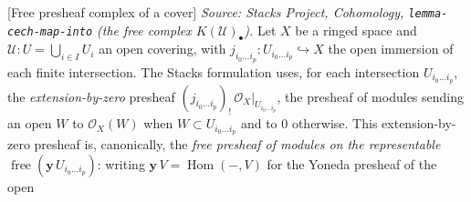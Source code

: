 \begin{definition}

[Free presheaf complex of a cover]
  \label{def:cech_free_presheaf_complex}
  \textit{Source: Stacks Project, Cohomology,
  \texttt{lemma-cech-map-into} (the free complex \(K(\mathcal{U})_\bullet\)).}
  Let \(X\) be a ringed space and \(\mathcal{U} : U = \bigcup_{i \in I} U_i\) an
  open covering, with \(j_{i_0 \ldots i_p} : U_{i_0 \ldots i_p} \hookrightarrow X\)
  the open immersion of each finite intersection. The Stacks formulation uses, for
  each intersection \(U_{i_0 \ldots i_p}\), the \emph{extension-by-zero} presheaf
  \((j_{i_0 \ldots i_p})_{!}\,\mathcal{O}_X|_{U_{i_0 \ldots i_p}}\), the presheaf of
  modules sending an open \(W\) to \(\mathcal{O}_X(W)\) when
  \(W \subset U_{i_0 \ldots i_p}\) and to \(0\) otherwise. This extension-by-zero
  presheaf is, canonically, the \emph{free presheaf of modules on the representable}
  \(\operatorname{free}(\mathbf{y}\,U_{i_0 \ldots i_p})\): writing
  \(\mathbf{y}\,V = \operatorname{Hom}(-, V)\) for the Yoneda presheaf of the open

\end{definition}
